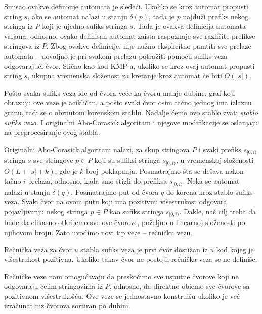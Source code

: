 Smisao ovakve definicije automata je slede\' ci. Ukoliko se kroz automat propusti string $s$, ako se automat nalazi u stanju $\delta(p)$, tada je $p$ najdu\v zi prefiks nekog stringa iz $P$ koji je ujedno sufiks stringa $s$. Tada je ovakva definicija automata valjana, odnosno, ovako definisan automat zaista raspoznaje sve razli\v cite prefikse stringova iz $P$. Zbog ovakve definicije, nije nu\v zno eksplicitno pamtiti sve prelaze automata -- dovoljno je pri svakom prelazu potra\v ziti pomo\' cu sufiks veza odgovaraju\' ci \v cvor. Sli\v cno kao kod KMP-a, ukoliko se kroz ovaj automat propusti string $s$, ukupna vremenska slo\v zenost za kretanje kroz automat \' ce biti $O(|s|)$. \cite{ahorad}

Po\v sto svaka sufiks veza ide od \v cvora ve\' ce ka \v cvoru manje dubine, graf koji obrazuju ove veze je acikli\v can, a po\v sto svaki \v cvor osim ta\v cno jednog ima izlaznu granu, radi se o obrnutom korenskom stablu. Nadalje \' cemo ovo stablo zvati \textit{stablo sufiks veza}. I originalni Aho-Corasick algoritam i njegove modifikacije se oslanjaju na preprocesiranje ovog stabla.

Originalni Aho-Corasick algoritam nalazi, za skup stringova $P$ i svaki prefiks $s_{[0,i)}$ stringa $s$ sve stringove $p \in P$ koji su sufiksi stringa $s_{[0,i)}$, u vremenskoj slo\v zenosti $O(L+|s|+k)$, gde je $k$ broj poklapanja. Posmatrajmo \v sta se de\v sava nakon ta\v cno $i$ prelaza, odnosno, kada smo stigli do prefiksa $s_{[0,i)}$. Neka se automat nalazi u stanju $\delta(q)$. Posmatrajmo put od \v cvora $q$ do korena kroz stablo sufiks veza. Svaki \v cvor na ovom putu koji ima pozitivnu vi\v sestrukost odgovara pojavljivanju nekog stringa $p \in P$ kao sufiks stringa $s_{[0,i)}$. Dakle, na\v s cilj treba da bude da efikasno otkrijemo sve ove \v cvorove, po\v zeljno u linearnoj slo\v zenosti po njihovom broju. Zato uvodimo novi tip veze -- re\v cni\v cku vezu.

\begin{dfn}
Re\v cni\v cka veza za \v cvor $u$ stabla sufiks veza je prvi \v cvor dosti\v zan iz $u$ kod kojeg je vi\v sestrukost pozitivna. Ukoliko takav \v cvor ne postoji, re\v cni\v cka veza se ne defini\v se.
\end{dfn}

Re\v cni\v cke veze nam omogu\' cavaju da presko\v cimo sve usputne \v cvorove koji ne odgovaraju celim stringovima iz $P$, odnosno, da direktno obi\dj emo sve \v cvorove sa pozitivnom vi\v sestruko\v s\' cu. Ove veze se jednostavno konstrui\v su ukoliko je ve\' c izra\v cunat niz \v cvorova sortiran po dubini.


